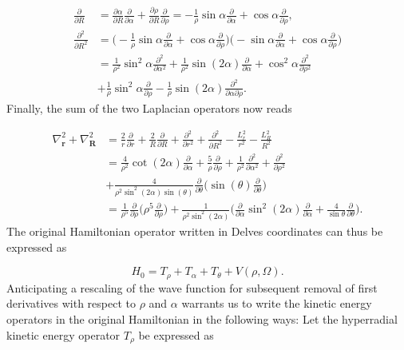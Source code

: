 \begin{align}
	\frac{\partial}{\partial R}        &= \frac{\partial\alpha}{\partial R} \frac{\partial}{\partial\alpha} +  \frac{\partial\rho}{\partial R} \frac{\partial}{\partial\rho} = -\frac{1}{\rho}\sin{\alpha}\frac{\partial}{\partial \alpha} + \cos{\alpha}\frac{\partial}{\partial \rho},  \\
	\frac{\partial^2}{\partial R^2}&= \bigg( -\frac{1}{\rho} \sin\alpha \frac{\partial}{\partial\alpha} + \cos\alpha \frac{\partial}{\partial\rho}\bigg)  \bigg( -  \sin\alpha \frac{\partial}{\partial\alpha} + \cos\alpha \frac{\partial}{\partial\rho}\bigg) \nonumber \\
	&= \frac{1}{\rho^2} \sin^2\alpha\frac{\partial^2}{\partial\alpha^{2}} + \frac{1}{\rho^2} \sin(2\alpha)\frac{\partial}{\partial\alpha} + \cos^2\alpha \frac{\partial^2}{\partial \rho^2} \nonumber \\
	&+\frac{1}{\rho}\sin^2\alpha\frac{\partial}{\partial \rho}- \frac{1}{\rho} \sin(2\alpha) \frac{\partial^2}{\partial\alpha \partial\rho}.
\end{align}
Finally, the sum of the two Laplacian operators now reads 

\begin{align}
\nabla^2_{\mathbf{r}} + \nabla^2_{\mathbf{R}} &= \frac{2}{r}\frac{\partial}{\partial r} +  \frac{2}{R} \frac{\partial}{\partial R}  +\frac{\partial^2}{\partial r^{2}} + \frac{\partial^2}{\partial R^{2}} - \frac{L^{2}_{r}}{r^2} - \frac{L^{2}_{R}}{R^2} \nonumber \\
&= \frac{4}{\rho^2} \cot(2\alpha) \frac{\partial}{\partial\alpha} + \frac{5}{\rho} \frac{\partial}{\partial\rho} + \frac{1}{\rho^2} \frac{\partial^2}{\partial\alpha^2} + \frac{\partial^2}{\partial\rho^2} \nonumber \\
&+ \frac{4}{\rho^2 \sin^2(2\alpha)\sin(\theta)} \frac{\partial}{\partial\theta} \bigg( \sin(\theta) \frac{\partial}{\partial{\theta}} \bigg) \nonumber \\
&= \frac{1}{\rho^5}\frac{\partial}{\partial\rho} \bigg( \rho^5 \frac{\partial}{\partial\rho} \bigg) + \frac{1}{\rho^2 \sin^2(2\alpha)}  \bigg( \frac{\partial}{\partial\alpha} \sin^2(2\alpha) \frac{\partial}{\partial\alpha} + \frac{4}{\sin\theta} \frac{\partial}{\partial\theta} \bigg).
\end{align}
The original Hamiltonian operator written in Delves coordinates can thus be expressed as 

\begin{equation}
H_0 = T_{\rho} + T_{\alpha} + T_{\theta} + V(\rho,\Omega).
\end{equation}  
Anticipating a rescaling of the wave function for subsequent removal of first derivatives with respect to $\rho$ and $\alpha$ warrants us to write the kinetic energy operators in the original Hamiltonian in the following ways: Let the hyperradial kinetic energy operator $T_{\rho}$ be expressed as

